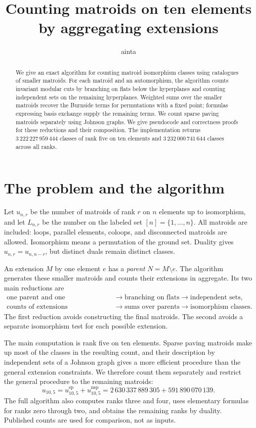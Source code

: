 \documentclass[11pt]{article}
\title{Counting matroids on ten elements\\by aggregating extensions}
\author{ainta}
\date{}
\theoremstyle{definition}
\newcounter{algorithm}
\newcommand{\SP}{\mathrm{sp}}
\newcommand{\nsp}{\mathrm{nsp}}
\newcommand{\uFive}{3\,222\,227\,959\,444}
\newcommand{\uTen}{3\,232\,000\,741\,644}
\newcommand{\uSparse}{2\,630\,337\,889\,305}
\newcommand{\uNonSparse}{591\,890\,070\,139}
\begin{document}
\maketitle

\begin{abstract}
We give an exact algorithm for counting matroid isomorphism classes using
catalogues of smaller matroids. For each matroid and an automorphism, the
algorithm counts invariant modular cuts by branching on flats below the
hyperplanes and counting independent sets on the remaining hyperplanes.
Weighted sums over the smaller matroids recover the Burnside terms for
permutations with a fixed point; formulas expressing basis exchange supply
the remaining terms. We count sparse paving matroids separately using
Johnson graphs. We give pseudocode and correctness proofs for these
reductions and their composition. The implementation returns $\uFive$
classes of rank five on ten elements and
$\uTen$ classes across all ranks.
\end{abstract}

\section{The problem and the algorithm}

Let $u_{n,r}$ be the number of matroids of rank $r$ on $n$ elements up to
isomorphism, and let $L_{n,r}$ be the number on the labeled set
$[n]=\{1,\ldots,n\}$.
All matroids are included: loops, parallel elements, coloops, and disconnected
matroids are allowed. Isomorphism means a permutation of the ground set.
Duality gives $u_{n,r}=u_{n,n-r}$, but distinct duals remain distinct classes.

An extension $M$ by one element $e$ has a \emph{parent} $N=M\setminus e$.
The algorithm generates these smaller matroids and counts their extensions
in aggregate. Its two main reductions are
\[
\begin{aligned}
\text{one parent and one automorphism}
&\longrightarrow \text{branching on flats}
\longrightarrow \text{independent sets},\\
\text{counts of extensions}
&\longrightarrow \text{sums over parents}
\longrightarrow \text{isomorphism classes}.
\end{aligned}
\]
The first reduction avoids constructing the final matroids. The second
avoids a separate isomorphism test for each possible extension.

The main computation is rank five on ten elements. Sparse paving matroids
make up most of the classes in the resulting count, and their description
by independent sets of a Johnson graph gives a more efficient procedure
than the general extension constraints. We therefore count them separately
and restrict the general procedure to the remaining matroids:
\begin{equation}\label{eq:partition-result}
u_{10,5}=u^{\SP}_{10,5}+u^{\nsp}_{10,5}
       =\uSparse+\uNonSparse.
\end{equation}
The full algorithm also computes ranks three and four, uses elementary
formulas for ranks zero through two, and obtains the remaining ranks by
duality. Published counts are used for comparison, not as inputs.
\end{document}

